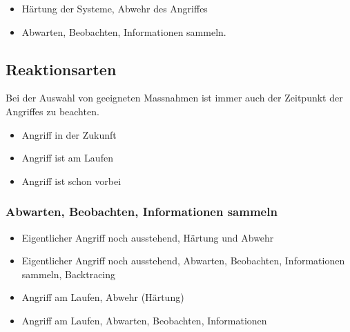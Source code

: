 \begin{itemize}
  \item Härtung der Systeme, Abwehr des Angriffes
  \item Abwarten, Beobachten, Informationen sammeln.
\end{itemize}


\subsection{Reaktionsarten}
Bei der Auswahl von geeigneten Massnahmen ist immer auch der Zeitpunkt der Angriffes zu beachten.

\begin{itemize}
  \item Angriff in der Zukunft
  \item Angriff ist am Laufen
  \item Angriff ist schon vorbei
\end{itemize}

\subsubsection{Abwarten, Beobachten, Informationen sammeln}

\begin{itemize}
  \item Eigentlicher Angriff noch ausstehend, Härtung und Abwehr
  \item Eigentlicher Angriff noch ausstehend, Abwarten, Beobachten, Informationen sammeln, Backtracing
  \item Angriff am Laufen, Abwehr (Härtung)
  \item Angriff am Laufen, Abwarten, Beobachten, Informationen
\end{itemize}


